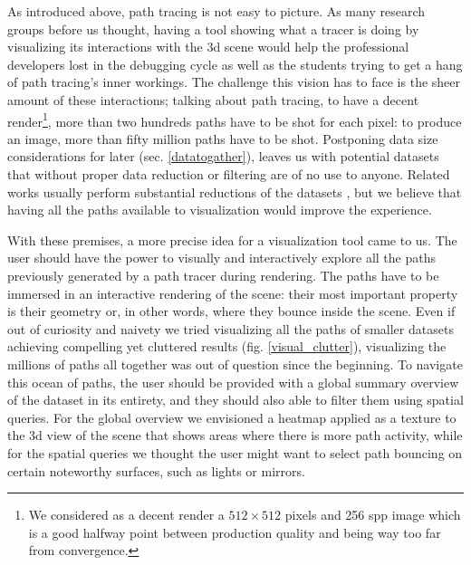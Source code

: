 As introduced above, path tracing is not easy to picture. As many research groups before us thought, having a tool showing what a tracer is doing by visualizing its interactions with the 3d scene would help the professional developers lost in the debugging cycle as well as the students trying to get a hang of path tracing's inner workings. The challenge this vision has to face is the sheer amount of these interactions; talking about path tracing, to have a decent render\footnote{We considered as a decent render a $512 \times 512$ pixels and 256 spp image which is a good halfway point between production quality and being way too far from convergence.}, more than two hundreds paths have to be shot for each pixel: to produce an image, more than fifty million paths have to be shot. Postponing data size considerations for later (sec. \ref{datatogather}), leaves us with potential datasets that without proper data reduction or filtering are of no use to anyone. Related works usually perform substantial reductions of the datasets \cite{simons2019applying,EMCA@2019}, but we believe that having all the paths available to visualization would improve the experience.

With these premises, a more precise idea for a visualization tool came to us. 
The user should have the power to visually and interactively explore all the paths previously generated by a path tracer during rendering. The paths have to be immersed in an interactive rendering of the scene: their most important property is their geometry or, in other words, where they bounce inside the scene. Even if out of curiosity and naivety we tried visualizing all the paths of smaller datasets achieving compelling yet cluttered results (fig. \ref{visual_clutter}), visualizing the millions of paths all together was out of question since the beginning. To navigate this ocean of paths, the user should be provided with a global summary overview of the dataset in its entirety, and they should also able to filter them using spatial queries. For the global overview we envisioned a heatmap applied as a texture to the 3d view of the scene that shows areas where there is more path activity, while for the spatial queries we thought the user might want to select path bouncing on certain noteworthy surfaces, such as lights or mirrors. 

